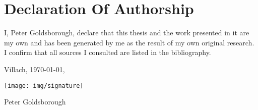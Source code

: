 \chapter*{Declaration Of Authorship}

I, Peter Goldsborough, declare that this thesis and the work presented in it are my own and has been generated by me as the result of my own original research. I confirm that all sources I consulted are listed in the bibliography. \parbreak

Villach, \today, \parbreak \parbreak

\texttt{[image: img/signature]} \parbreak

Peter Goldsborough
